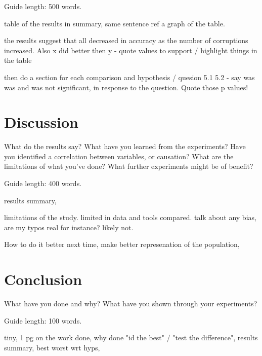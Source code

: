 \documentclass{csfourzero}
\begin{document}
Guide length: 500 words.

table of the results in summary, same sentence ref a graph of the table.

the results suggest that all decreased in accuracy as the number of corruptions increased. Also x did better then y - quote values to support / highlight things in the table

then do a section for each comparison and hypothesis / quesion 5.1 5.2 - say was was and was not significant, in response to the question. Quote those p values!

\section{Discussion}
\label{sec:discuss}

What do the results say? What have you learned from the
experiments? Have you identified a correlation between variables, or
causation? What are the limitations of what you've done? What further
experiments might be of benefit?

Guide length: 400 words.

results summary,

limitations of the study. limited in data and tools compared. talk about any bias, are my typos real for instance? likely not.

How to do it better next time, make better represenation of the population,

\section{Conclusion}
\label{sec:conc}

What have you done and why? What have you shown through your
experiments?

Guide length: 100 words.

tiny, 1 pg on the work done, why done "id the best" / "test the difference", results summary, best worst wrt hyps,


\end{document}
